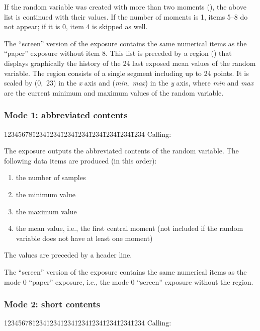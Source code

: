 If the random variable was created with more than two
moments (), the above list is continued with their values.
If the number of moments is 1, items 5--8 do not appear; if it is
0, item 4 is skipped as well.

The ``screen'' version of the exposure contains the same numerical items as the
``paper'' exposure without item 8.
This list is preceded by a region () that displays
graphically the history of the 24 last exposed mean values of the
random variable.
The region consists of a single segment including up to 24 points.
It is scaled by (0,~23) in the {\em x\/} axis and ({\em min},~{\em max\/})
in the
{\em y\/} axis, where {\em min\/} and {\em max\/}
are the current minimum and maximum values
of the random variable.

\subsubsection*{Mode 1: abbreviated contents}

{\tt\begin{tabbing}
12345678\=1234\=1234\=1234\=1234\=1234\=1234\=1234\=1234\kill
{\rm Calling:}
\end{tabbing}}

The exposure outputs the abbreviated contents of the random variable.
The following data items are produced (in this order):

\begin{enumerate}
\item
the number of samples
\item
the minimum value
\item
the maximum value
\item
the mean value, i.e., the first central moment
(not included if the random variable does not have at least one moment)
\end{enumerate}

The values are preceded by a header line.

The ``screen'' version of the exposure contains the same numerical items as the
mode 0 ``paper'' exposure, i.e., the mode 0 ``screen'' exposure without
the region.

\subsubsection*{Mode 2: short contents}

{\tt\begin{tabbing}
12345678\=1234\=1234\=1234\=1234\=1234\=1234\=1234\=1234\kill
{\rm Calling:}
\end{tabbing}}

